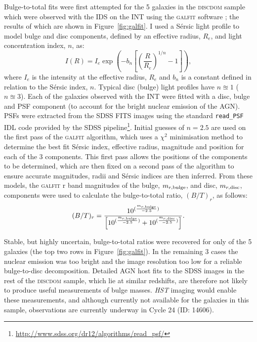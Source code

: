 Bulge-to-total fits were first attempted for the 5 galaxies in the \textsc{discdom} sample which were observed with the IDS on the INT using the \textsc{galfit} software \citep{peng02}; the results of which are shown in Figure~\ref{fig:galfit}. I used a S\'ersic light profile \citep{sersic68} to model bulge and disc components, defined by an effective radius, $R_e$, and light concentration index, $n$, as:
\begin{equation}\label{sersic}
I(R) = I_e \exp \left(  -b_n \left[  \left( \frac{R}{R_e}\right)^{1/n} -1 \right] \right),
\end{equation}
where $I_e$ is the intensity at the effective radius, $R_e$ and $b_n$ is a constant defined in relation to the S\'ersic index, $n$. Typical disc (bulge) light profiles have $n\approxeq1$ ($n\approxeq3$). Each of the galaxies observed with the INT were fitted with a disc, bulge and PSF component (to account for the bright nuclear emission of the AGN). PSFs were extracted from the SDSS FITS images using the standard \texttt{read\_PSF} IDL code provided by the SDSS pipeline\footnote{\url{http://www.sdss.org/dr12/algorithms/read_psf/}}. Initial guesses of $n=2.5$ are used on the first pass of the \textsc{galfit} algorithm, which uses a $\chi^2$ minimisation method to determine the best fit S\'ersic index, effective radius, magnitude and position for each of the 3 components. This first pass allows the positions of the components to be determined, which are then fixed on a second pass of the algorithm to ensure accurate magnitudes, radii and S\'ersic indices are then inferred. From these models, the \textsc{galfit} r band magnitudes of the bulge, $m_{r, \rm{bulge}}$, and disc, $m_{r, \rm{disc}}$, components were used to calculate the bulge-to-total ratio, $(B/T)_r$, as follows:
\begin{equation}\label{btratio}
(B/T)_r = \frac{10^{(\frac{m_{r, \rm{bulge}}}{-2.5})}}{\left[10^{(\frac{m_{r, \rm{bulge}}}{-2.5})} + 10^{(\frac{m_{r, \rm{disc}}}{-2.5})}\right]}.
\end{equation}

Stable, but highly uncertain, bulge-to-total ratios were recovered for only {} of the 5 galaxies (the top two rows in Figure~\ref{fig:galfit}). In the remaining 3 cases the nuclear emission was too bright and the image resolution too low for a reliable bulge-to-disc decomposition.  Detailed AGN host fits to the SDSS images in the rest of the \textsc{discdom} sample, which lie at similar redshifts, are therefore not likely to produce useful measurements of bulge masses. \emph{HST} imaging would enable these measurements, and although currently not available for the galaxies in this sample, observations are currently underway in Cycle 24 (ID: 14606). 

